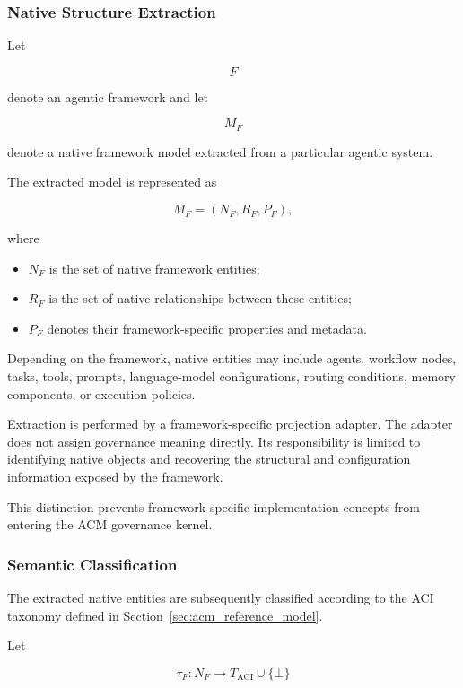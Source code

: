 \documentclass[10pt]{article}
\begin{document}
\subsubsection{Native Structure Extraction}

Let

\[
F
\]

denote an agentic framework and let

\[
M_F
\]

denote a native framework model extracted from a particular agentic system.

The extracted model is represented as

\[
M_F=(N_F,R_F,P_F),
\tag{39}
\]

where

\begin{itemize}
	\item $N_F$ is the set of native framework entities;
	\item $R_F$ is the set of native relationships between these entities;
	\item $P_F$ denotes their framework-specific properties and metadata.
\end{itemize}

Depending on the framework, native entities may include agents, workflow nodes,
tasks, tools, prompts, language-model configurations, routing conditions,
memory components, or execution policies.

Extraction is performed by a framework-specific projection adapter. The adapter
does not assign governance meaning directly. Its responsibility is limited to
identifying native objects and recovering the structural and configuration
information exposed by the framework.

This distinction prevents framework-specific implementation concepts from
entering the ACM governance kernel.

\subsubsection{Semantic Classification}

The extracted native entities are subsequently classified according to the ACI
taxonomy defined in Section~\ref{sec:acm_reference_model}.

Let

\[
\tau_F :
N_F
\rightarrow
T_{\mathrm{ACI}}
\cup
\{\bot\}
\tag{40}
\]
\end{document}
